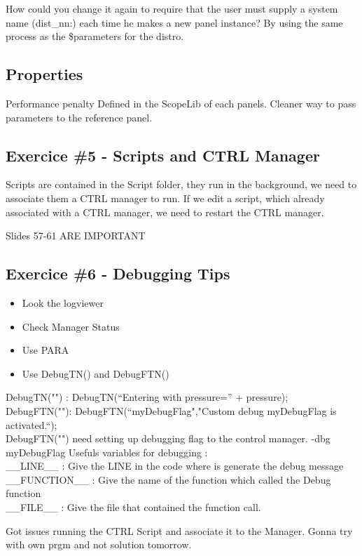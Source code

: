 \documentclass[a4paper, 10pt]{article}
\begin{document}
How could you change it again to require that the user must supply a system name (dist\_nn:) each time he makes a new panel instance?
By using the same process as the \$parameters for the distro.

\subsection{Properties}
Performance penalty
Defined in the ScopeLib of each panels.
Cleaner way to pass parameters to the reference panel.

\subsection{Exercice \#5 - Scripts and CTRL Manager}
Scripts are contained in the Script folder, they run in the background, we need to associate them a CTRL manager to run.
If we edit a script, which already associated with a CTRL manager, we need to restart the CTRL manager.

Slides 57-61 ARE IMPORTANT

\subsection{Exercice \#6 - Debugging Tips}
\begin{itemize}
    \item Look the logviewer
    \item Check Manager Status
    \item Use PARA
    \item Use DebugTN() and DebugFTN()
\end{itemize}
DebugTN("") : DebugTN(“Entering with pressure=” + pressure);\\
DebugFTN(""): DebugFTN(“myDebugFlag","Custom debug myDebugFlag is activated.“);\\
DebugFTN("") need setting up debugging flag to the control manager. -dbg myDebugFlag
Usefuls variables for debugging :\\
\_\_LINE\_\_ : Give the LINE in the code where is generate the debug message\\
\_\_FUNCTION\_\_ : Give the name of the function which called the Debug function\\
\_\_FILE\_\_ : Give the file that contained the function call.

Got issues running the CTRL Script and associate it to the Manager.
Gonna try with own prgm and not solution tomorrow.
\end{document}
